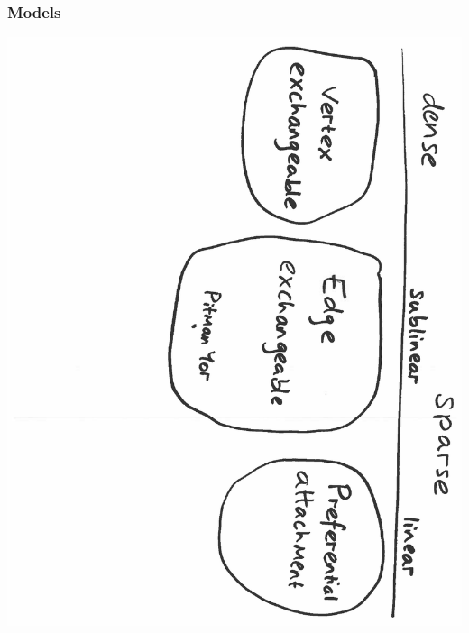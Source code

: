 \documentclass[final,hyperref={pdfpagelabels=false},noamsthm]{beamer}
\begin{document}
\begin{frame}
	\frametitle{Models}
	\includegraphics[angle=90,origin=c,scale=0.4]{fig/models5}
\end{frame}
\end{document}
